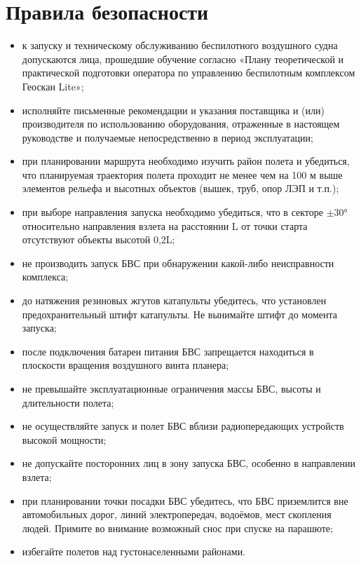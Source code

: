\documentclass[a4paper,10pt,russian,openany]{sphinxmanual}
\begin{document}
\chapter{Правила безопасности}
\label{\detokenize{precautions:id1}}\label{\detokenize{precautions::doc}}
\begin{itemize}
\item {} 
к запуску и техническому обслуживанию беспилотного воздушного судна допускаются лица, прошедшие обучение согласно «Плану теоретической и практической подготовки оператора по управлению беспилотным комплексом Геоскан Lite»;

\item {} 
исполняйте письменные рекомендации и указания поставщика и (или) производителя по использованию оборудования, отраженные в настоящем руководстве и получаемые непосредственно в период эксплуатации;

\item {} 
при планировании маршрута необходимо изучить район полета и убедиться, что планируемая траектория полета проходит не менее чем на 100 м выше элементов рельефа и высотных объектов (вышек, труб, опор ЛЭП и т.п.);

\item {} 
при выборе направления запуска необходимо убедиться, что в секторе \(\pm\)30° относительно направления взлета на расстоянии L от точки старта отсутствуют объекты высотой 0,2L;

\item {} 
не производить запуск БВС при обнаружении какой-либо неисправности комплекса;

\item {} 
до натяжения резиновых жгутов катапульты убедитесь, что установлен предохранительный штифт катапульты. Не вынимайте штифт до момента запуска;

\item {} 
после подключения батареи питания БВС запрещается находиться в плоскости вращения воздушного винта планера;

\item {} 
не превышайте эксплуатационные ограничения массы БВС, высоты и длительности полета;

\item {} 
не осуществляйте запуск и полет БВС вблизи радиопередающих устройств высокой мощности;

\item {} 
не допускайте посторонних лиц в зону запуска БВС, особенно в направлении взлета;

\item {} 
при планировании точки посадки БВС убедитесь, что БВС приземлится вне автомобильных дорог, линий электропередач, водоёмов, мест скопления людей. Примите во внимание возможный снос при спуске на парашюте;

\item {} 
избегайте полетов над густонаселенными районами.

\end{itemize}
\end{document}
